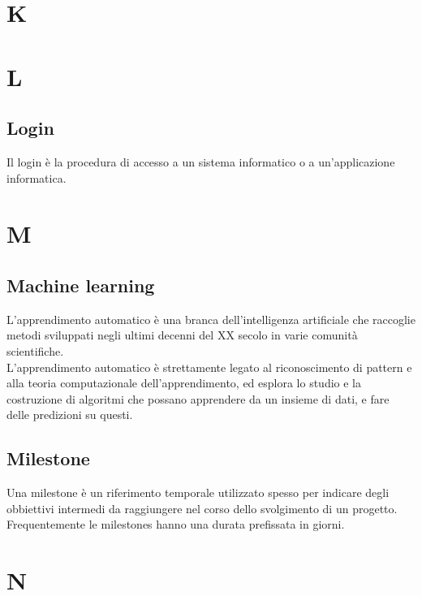 \newpage
\section{K}

\newpage
\section{L}
\subsection{Login}
Il login è la procedura di accesso a un sistema informatico o a un'applicazione informatica.

\newpage
\section{M}
\subsection{Machine learning}
L'apprendimento automatico è una branca dell'intelligenza artificiale che raccoglie metodi sviluppati negli ultimi decenni del XX secolo in varie comunità scientifiche.\\
L'apprendimento automatico è strettamente legato al riconoscimento di pattern e alla teoria computazionale dell'apprendimento, ed esplora lo studio e la costruzione di algoritmi che possano apprendere da un insieme di dati, e fare delle predizioni su questi.

\subsection{Milestone}
Una milestone è un riferimento temporale utilizzato spesso per indicare degli obbiettivi intermedi da raggiungere nel corso dello svolgimento di un progetto. Frequentemente le milestones hanno una durata prefissata in giorni.

\newpage
\section{N}

\newpage
